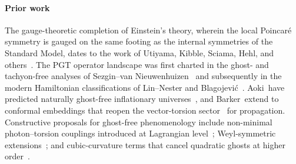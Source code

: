 \paragraph*{Prior work}
The gauge-theoretic completion of Einstein's theory, wherein
the local Poincar\'e symmetry is gauged
on the same footing as the internal symmetries of the Standard
Model, dates to the work of Utiyama, Kibble, Sciama, Hehl, and
others~\cite{utiyama1956invariant, kibble1961lorentz, sciama1962physical, hayashi1979new, trautman1972einstein, hehl1976spin, hehl1995metric, blagojevic2002gravitation}.
The PGT operator landscape was first charted in
the ghost- and tachyon-free analyses of Sezgin--van
Nieuwenhuizen~\cite{sezgin1980ghostfree, Sezgin:1981xs} and
subsequently in the modern Hamiltonian classifications of
Lin--Nester and
Blagojevi\'c~\cite{lin2019pgt, blagojevic2018hamiltonian}.
Aoki~\etal have predicted naturally ghost-free inflationary universes~\cite{Aoki:2020zqm},
and Barker~\etal extend to conformal embeddings that reopen
the vector-torsion
sector~\cite{barker2021hamiltonian, barker2024poincare} for propagation.
Constructive proposals for ghost-free phenomenology include
non-minimal photon--torsion couplings introduced at
Lagrangian
level~\cite{hehl2000electromagnetic, rubilar2003torsion, itin2004maxwell};
Weyl-symmetric extensions~\cite{karananas2024weyl, legner2025torc};
and cubic-curvature terms that cancel quadratic ghosts at
higher order~\cite{bahamonde2025cubic}.

